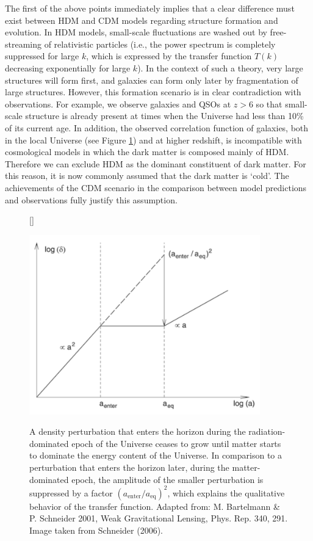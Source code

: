 \documentclass[a4paper,11pt]{article}
\begin{document}
{\noindent}The first of the above points immediately implies that a clear difference must exist between HDM and CDM models regarding structure formation and evolution. In HDM models, small-scale fluctuations are washed out by free-streaming of relativistic particles (i.e., the power spectrum is completely suppressed for large $k$, which is expressed by the transfer function $T(k)$ decreasing exponentially for large $k$). In the context of such a theory, very large structures will form first, and galaxies can form only later by fragmentation of large structures. However, this formation scenario is in clear contradiction with observations. For example, we observe galaxies and QSOs at $z>6$ so that small-scale structure is already present at times when the Universe had less than 10\% of its current age. In addition, the observed correlation function of galaxies, both in the local Universe (see Figure \ref{fig:densitycontrast}) and at higher redshift, is incompatible with cosmological models in which the dark matter is composed mainly of HDM. Therefore we can exclude HDM as the dominant constituent of dark matter. For this reason, it is now commonly assumed that the dark matter is ‘cold’. The achievements of the CDM scenario in the comparison between model predictions and observations fully justify this assumption.

\begin{figure}[t]
    [\FBwidth]
    {\caption{\footnotesize{A density perturbation that enters the horizon during the radiation-dominated epoch of the Universe ceases to grow until matter starts to dominate the energy content of the Universe. In comparison to a perturbation that enters the horizon later, during the matter-dominated epoch, the amplitude of the smaller perturbation is suppressed by a factor $(a_\mathrm{enter}/a_\mathrm{eq})^2$, which explains the qualitative behavior of the transfer function. Adapted from: M. Bartelmann \& P. Schneider 2001, Weak Gravitational Lensing, Phys. Rep. 340, 291. Image taken from Schneider (2006).}}
    \label{fig:densitycontrast}}
    {\includegraphics[width=10cm]{figures/DensityContrast.png}}
\end{figure}
\end{document}
